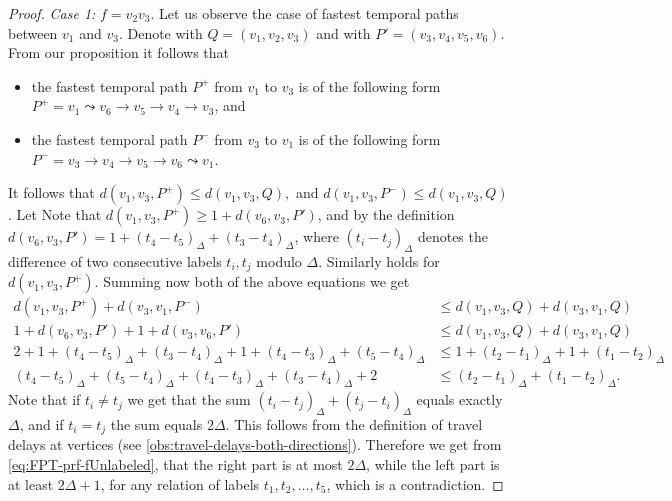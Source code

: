 \documentclass[a4paper,UKenglish,cleveref, autoref, thm-restate]{lipics-v2021}
\begin{document}
\begin{proof}
    \emph{Case 1: }$f = v_2v_3$.
    Let us observe the case of fastest temporal paths between $v_{1}$ and $v_{3}$.
    Denote with $Q = (v_{1}, v_2, v_3)$ and with $P' = (v_3,v_4,v_5,v_6)$.
    From our proposition it follows that
    \begin{itemize}
        \item the fastest temporal path $P ^ +$ from $v_1$ to $v_3$ 
    is of the following form 
    $P^+ = v_{1}  \leadsto v_6 \rightarrow v_5 \rightarrow v_4 \rightarrow v_3$,
    and
        \item the fastest temporal path $P ^ -$ from $v_{3}$ to $v_{1}$ 
    is of the following form 
    $P^- = v_{3} \rightarrow v_{4} \rightarrow v_5 \rightarrow v_6 \leadsto v_1$.
    \end{itemize}
    It follows that 
    $
    d(v_{1}, v_{3}, P^+) \leq d(v_{1}, v_{3}, Q),
    $
    and
    $
    d(v_{1}, v_{3}, P^-) \leq d(v_{1}, v_{3}, Q)
    $.
    Let 
    Note that $d(v_{1}, v_{3}, P^+) \geq 1 + d(v_6,v_3,P')$,
    and by the definition $d(v_6,v_3,P') = 1 + (t_4 - t_5)_\Delta + (t_3 - t_4)_\Delta$,
    where $(t_i - t_j)_\Delta$ denotes the difference of two consecutive labels $t_i, t_j$ modulo $\Delta$.
    Similarly holds for $d(v_{1}, v_{3}, P^+)$.
    Summing now both of the above equations we get
    \begin{equation}
    \begin{split} \label{eq:FPT-prf-fUnlabeled}
        d(v_{1}, v_{3}, P^+) + d(v_{3}, v_{1}, P^-) &\leq 
        d(v_{1}, v_{3}, Q) + d(v_{3}, v_{1}, Q) \\
        1 + d(v_6,v_3,P') + 1 + d(v_3,v_6,P') &\leq d(v_{1}, v_{3}, Q) + d(v_{3}, v_{1}, Q) \\
        2 + 
        1 + (t_4 - t_5)_\Delta + (t_3 - t_4)_\Delta +
        1 + (t_4 - t_3)_\Delta + (t_5 - t_4)_\Delta 
        &\leq 
        1 + (t_2 - t_1)_\Delta + 
        1 + (t_1 - t_2)_\Delta\\
        (t_4 - t_5)_\Delta + (t_5 - t_4)_\Delta +
        (t_4 - t_3)_\Delta + (t_3 - t_4)_\Delta  + 2 
        &\leq 
        (t_2 - t_1)_\Delta + (t_1 - t_2)_\Delta.
    \end{split}
    \end{equation}
    Note that if $t_i \neq t_j$ we get that 
    the sum
    $(t_i - t_j)_\Delta + (t_j - t_i)_\Delta$ equals exactly $\Delta$,
    and if $t_i = t_j$ the sum equals $2\Delta$.
    This follows from the definition of travel delays at vertices (see \cref{obs:travel-delays-both-directions}).
    Therefore we get from \cref{eq:FPT-prf-fUnlabeled}, 
    that the right part is at most $2 \Delta$, while the left part is at least $2 \Delta + 1$,
    for any relation of labels $t_1,t_2, \dots, t_5$,
    which is a contradiction.


\end{proof}
\end{document}
